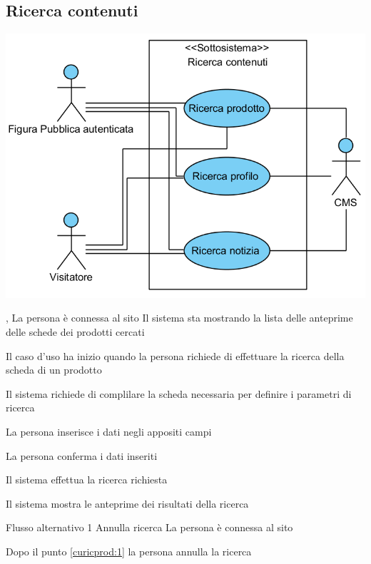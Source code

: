\subsection{Ricerca contenuti}
\begin{center}
   \includegraphics[width=\textwidth]{assets/visualParadigm/cu/RicercaContenuti}
\end{center}
{, }
{La persona è connessa al sito}
{Il sistema sta mostrando la lista delle anteprime delle schede dei prodotti cercati}
{\begin{enumCU}
	\item Il caso d'uso ha inizio quando la persona richiede di effettuare la ricerca della scheda di un prodotto
	\item Il sistema richiede di complilare la scheda necessaria per definire i parametri di ricerca
	\item La persona inserisce i dati negli appositi campi \label{curicprod:1}
	\item La persona conferma i dati inseriti
	\item Il sistema effettua la ricerca richiesta
	\item Il sistema mostra le anteprime dei risultati della ricerca
\end{enumCU}
}
%
{Flusso alternativo 1}%
{Annulla ricerca}%
{La persona è connessa al sito}%
{\postNulle}%
{\begin{enumCU}
		\item Dopo il punto \ref{curicprod:1} la persona annulla la ricerca
	\end{enumCU}}%

